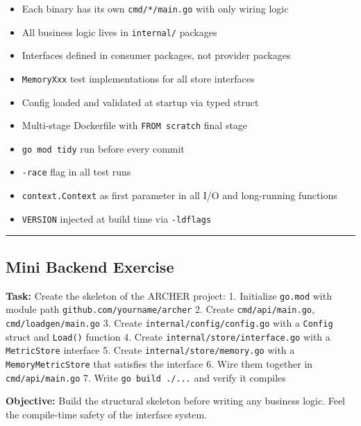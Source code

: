 \documentclass[
]{article}
\providecommand{\tightlist}{%
  \setlength{\itemsep}{0pt}\setlength{\parskip}{0pt}}
\begin{document}
\begin{itemize}
\tightlist
\item[$\square$]
  Each binary has its own \texttt{cmd/*/main.go} with only wiring logic
\item[$\square$]
  All business logic lives in \texttt{internal/} packages
\item[$\square$]
  Interfaces defined in consumer packages, not provider packages
\item[$\square$]
  \texttt{MemoryXxx} test implementations for all store interfaces
\item[$\square$]
  Config loaded and validated at startup via typed struct
\item[$\square$]
  Multi-stage Dockerfile with \texttt{FROM\ scratch} final stage
\item[$\square$]
  \texttt{go\ mod\ tidy} run before every commit
\item[$\square$]
  \texttt{-race} flag in all test runs
\item[$\square$]
  \texttt{context.Context} as first parameter in all I/O and
  long-running functions
\item[$\square$]
  \texttt{VERSION} injected at build time via \texttt{-ldflags}
\end{itemize}

\begin{center}\rule{0.5\linewidth}{0.5pt}\end{center}

\hypertarget{mini-backend-exercise-1}{%
\subsection{Mini Backend Exercise}\label{mini-backend-exercise-1}}

\textbf{Task:} Create the skeleton of the ARCHER project: 1. Initialize
\texttt{go.mod} with module path \texttt{github.com/yourname/archer} 2.
Create \texttt{cmd/api/main.go}, \texttt{cmd/loadgen/main.go} 3. Create
\texttt{internal/config/config.go} with a \texttt{Config} struct and
\texttt{Load()} function 4. Create \texttt{internal/store/interface.go}
with a \texttt{MetricStore} interface 5. Create
\texttt{internal/store/memory.go} with a \texttt{MemoryMetricStore} that
satisfies the interface 6. Wire them together in
\texttt{cmd/api/main.go} 7. Write \texttt{go\ build\ ./...} and verify
it compiles

\textbf{Objective:} Build the structural skeleton before writing any
business logic. Feel the compile-time safety of the interface system.
\end{document}
